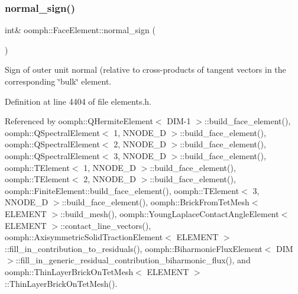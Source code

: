 \mbox{\label{classoomph_1_1FaceElement_add995e91979ad663e21cc2b63dd710d9}} 
\subsubsection{\texorpdfstring{normal\+\_\+sign()}{normal\_sign()}\hspace{0.1cm}{\footnotesize\ttfamily [1/2]}}
{\footnotesize\ttfamily int\& oomph\+::\+Face\+Element\+::normal\+\_\+sign (\begin{DoxyParamCaption}{ }\end{DoxyParamCaption})\hspace{0.3cm}{\ttfamily [inline]}}



Sign of outer unit normal (relative to cross-\/products of tangent vectors in the corresponding \char`\"{}bulk\char`\"{} element. 



Definition at line 4404 of file elements.\+h.



Referenced by oomph\+::\+Q\+Hermite\+Element$<$ D\+I\+M-\/1 $>$\+::build\+\_\+face\+\_\+element(), oomph\+::\+Q\+Spectral\+Element$<$ 1, N\+N\+O\+D\+E\+\_\+D $>$\+::build\+\_\+face\+\_\+element(), oomph\+::\+Q\+Spectral\+Element$<$ 2, N\+N\+O\+D\+E\+\_\+D $>$\+::build\+\_\+face\+\_\+element(), oomph\+::\+Q\+Spectral\+Element$<$ 3, N\+N\+O\+D\+E\+\_\+D $>$\+::build\+\_\+face\+\_\+element(), oomph\+::\+T\+Element$<$ 1, N\+N\+O\+D\+E\+\_\+D $>$\+::build\+\_\+face\+\_\+element(), oomph\+::\+T\+Element$<$ 2, N\+N\+O\+D\+E\+\_\+D $>$\+::build\+\_\+face\+\_\+element(), oomph\+::\+Finite\+Element\+::build\+\_\+face\+\_\+element(), oomph\+::\+T\+Element$<$ 3, N\+N\+O\+D\+E\+\_\+D $>$\+::build\+\_\+face\+\_\+element(), oomph\+::\+Brick\+From\+Tet\+Mesh$<$ E\+L\+E\+M\+E\+N\+T $>$\+::build\+\_\+mesh(), oomph\+::\+Young\+Laplace\+Contact\+Angle\+Element$<$ E\+L\+E\+M\+E\+N\+T $>$\+::contact\+\_\+line\+\_\+vectors(), oomph\+::\+Axisymmetric\+Solid\+Traction\+Element$<$ E\+L\+E\+M\+E\+N\+T $>$\+::fill\+\_\+in\+\_\+contribution\+\_\+to\+\_\+residuals(), oomph\+::\+Biharmonic\+Flux\+Element$<$ D\+I\+M $>$\+::fill\+\_\+in\+\_\+generic\+\_\+residual\+\_\+contribution\+\_\+biharmonic\+\_\+flux(), and oomph\+::\+Thin\+Layer\+Brick\+On\+Tet\+Mesh$<$ E\+L\+E\+M\+E\+N\+T $>$\+::\+Thin\+Layer\+Brick\+On\+Tet\+Mesh().

